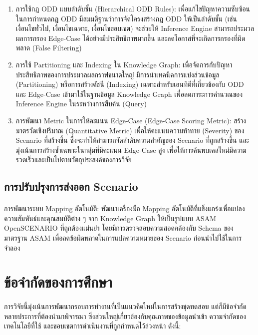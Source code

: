 \begin{enumerate}[label=\arabic*.)]
    \item การใช้กฎ ODD แบบลำดับชั้น (Hierarchical ODD Rules): เพื่อแก้ไขปัญหาความซับซ้อนในการกำหนดกฎ ODD มีสมมติฐานว่าการจัดโครงสร้างกฎ ODD ให้เป็นลำดับชั้น (เช่น เงื่อนไขทั่วไป, เงื่อนไขเฉพาะ, เงื่อนไขขอบเขต) จะช่วยให้ Inference Engine สามารถประมวลผลการกรอง Edge-Case ได้อย่างมีประสิทธิภาพมากขึ้น และลดโอกาสที่จะเกิดการกรองที่ผิดพลาด (False Filtering)
    \item การใช้ Partitioning และ Indexing ใน Knowledge Graph: เพื่อจัดการกับปัญหาประสิทธิภาพของการประมวลผลกราฟขนาดใหญ่ มีการนำเทคนิคการแบ่งส่วนข้อมูล (Partitioning) หรือการสร้างดัชนี (Indexing) เฉพาะสำหรับเอนทิตีที่เกี่ยวข้องกับ ODD และ Edge-Case เข้ามาใช้ในฐานข้อมูล Knowledge Graph เพื่อลดภาระการคำนวณของ Inference Engine ในระหว่างการสืบค้น (Query)
    \item การพัฒนา Metric ในการให้คะแนน Edge-Case (Edge-Case Scoring Metric): สร้างมาตรวัดเชิงปริมาณ (Quantitative Metric) เพื่อให้คะแนนความท้าทาย (Severity) ของ Scenario ที่สร้างขึ้น ซึ่งจะทำให้สามารถจัดลำดับความสำคัญของ Scenario ที่ถูกสร้างขึ้น และมุ่งเน้นการสร้างซ้ำเฉพาะในกลุ่มที่มีคะแนน Edge-Case สูง เพื่อให้การค้นพบเคสใหม่มีความรวดเร็วและเป็นไปตามวัตถุประสงค์ของการวิจัย
\end{enumerate}

\subsection{การปรับปรุงการส่งออก Scenario}\label{subsec:improving-scenario-export}
\paragraph{}
 การพัฒนาระบบ Mapping อัตโนมัติ: พัฒนาเครื่องมือ Mapping อัตโนมัติที่แข็งแกร่งเพื่อแปลงความสัมพันธ์และคุณสมบัติต่าง ๆ จาก Knowledge Graph ให้เป็นรูปแบบ ASAM OpenSCENARIO ที่ถูกต้องแม่นยำ โดยมีการตรวจสอบความสอดคล้องกับ Schema ของมาตรฐาน ASAM เพื่อลดข้อผิดพลาดในการแปลความหมายของ Scenario ก่อนนำไปใช้ในการจำลอง


\section{ข้อจำกัดของการศึกษา}\label{sec:limitations}
\paragraph{}

การวิจัยนี้มุ่งเน้นการพัฒนากรอบการทำงานที่เป็นแนวคิดใหม่ในการสร้างชุดทดสอบ แต่ก็มีข้อจำกัดหลายประการที่ต้องนำมาพิจารณา ซึ่งส่วนใหญ่เกี่ยวข้องกับคุณภาพของข้อมูลนำเข้า ความจำกัดของเทคโนโลยีที่ใช้ และขอบเขตการดำเนินงานที่ถูกกำหนดไว้ล่วงหน้า ดังนี้:

